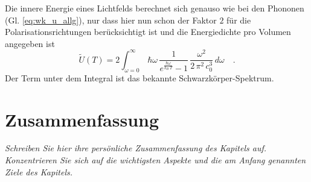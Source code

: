 Die innere Energie eines Lichtfelds berechnet sich genauso wie bei den Phononen (Gl. \ref{eq:wk_u_allg}), nur dass hier nun schon der Faktor $2$ für die Polarisationsrichtungen berücksichtigt ist und die Energiedichte pro Volumen angegeben ist
\begin{equation}
\tilde{U}(T) = 2  \int_{\omega=0}^{\infty} \, \hbar \omega \, 
\frac{1}{e^{\frac{\hbar \omega}{k_B \, T} }- 1}
\, \frac{\omega^2}{2 \, \pi^2 \, c_0^3} \, d\omega \quad .
\end{equation}
Der Term unter dem Integral  ist das bekannte Schwarzkörper-Spektrum.




\newpage
\section{Zusammenfassung}

\textit{Schreiben Sie hier ihre persönliche Zusammenfassung des Kapitels auf. Konzentrieren Sie sich auf die wichtigsten Aspekte und die am Anfang genannten Ziele des Kapitels.}

\vspace*{10cm}





\printbibliography[segment=\therefsegment,heading=subbibliography]
